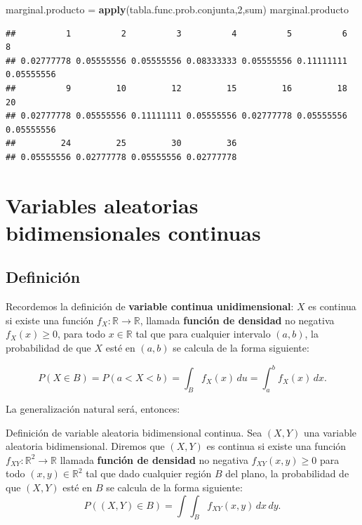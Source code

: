 \documentclass[]{book}
\newenvironment{Shaded}{\begin{snugshade}}{\end{snugshade}}
\newcommand{\DecValTok}[1]{\textcolor[rgb]{0.00,0.00,0.81}{#1}}
\newcommand{\KeywordTok}[1]{\textcolor[rgb]{0.13,0.29,0.53}{\textbf{#1}}}
\newcommand{\NormalTok}[1]{#1}
\newcommand{\StringTok}[1]{\textcolor[rgb]{0.31,0.60,0.02}{#1}}
\begin{document}
\begin{Shaded}
\begin{Highlighting}[]
\NormalTok{marginal.producto =}\StringTok{ }\KeywordTok{apply}\NormalTok{(tabla.func.prob.conjunta,}\DecValTok{2}\NormalTok{,sum)}
\NormalTok{marginal.producto}
\end{Highlighting}
\end{Shaded}

\begin{verbatim}
##          1          2          3          4          5          6          8 
## 0.02777778 0.05555556 0.05555556 0.08333333 0.05555556 0.11111111 0.05555556 
##          9         10         12         15         16         18         20 
## 0.02777778 0.05555556 0.11111111 0.05555556 0.02777778 0.05555556 0.05555556 
##         24         25         30         36 
## 0.05555556 0.02777778 0.05555556 0.02777778
\end{verbatim}

\hypertarget{variables-aleatorias-bidimensionales-continuas}{%
\section{Variables aleatorias bidimensionales continuas}\label{variables-aleatorias-bidimensionales-continuas}}

\hypertarget{definiciuxf3n-2}{%
\subsection{Definición}\label{definiciuxf3n-2}}

Recordemos la definición de \textbf{variable continua unidimensional}: \(X\) es continua si existe una función \(f_X:\mathbb{R}\longrightarrow \mathbb{R}\), llamada \textbf{función de densidad} no negativa \(f_X(x)\geq 0\), para todo \(x\in\mathbb{R}\) tal que para cualquier intervalo \((a,b)\), la probabilidad de que \(X\) esté en \((a,b)\) se calcula de la forma siguiente:

\[
P(X\in B)=P(a< X < b)=\int_B f_{X}(x)\,du=\int_a^b f_{X}(x)\,dx.
\]

La generalización natural será, entonces:

Definición de variable aleatoria bidimensional continua.
Sea \((X,Y)\) una variable aleatoria bidimensional. Diremos que \((X,Y)\) es continua si existe una función
\(f_{XY}:\mathbb{R}^2\longrightarrow \mathbb{R}\) llamada \textbf{función de densidad} no negativa \(f_{XY}(x,y)\geq 0\) para todo \((x,y)\in\mathbb{R}^2\) tal que dado cualquier región \(B\) del plano, la probabilidad de que \((X,Y)\) esté en \(B\) se calcula de la forma siguiente:
\[
P((X,Y)\in B)=\int\int_B f_{XY}(x,y)\,dx\,dy.
\]
\end{document}
